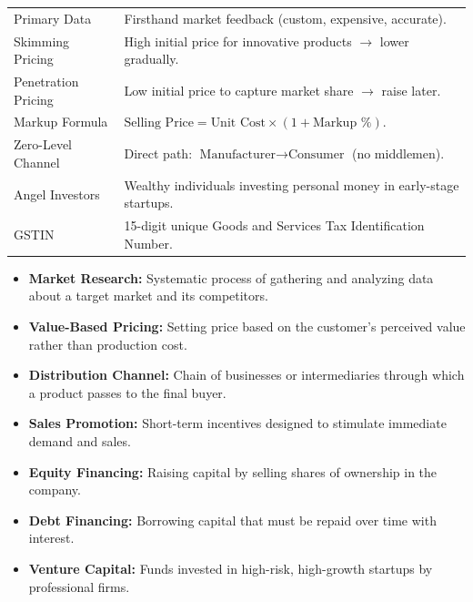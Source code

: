 \documentclass[12pt,a4paper]{article}
\renewcommand{\arraystretch}{1.45}
\begin{document}
\begin{tcolorbox}[formulabox, title={\textbf{Key Concepts at a Glance}}]
\renewcommand{\arraystretch}{1.3}
\begin{tabularx}{\linewidth}{B{4.0cm} X}
Primary Data & Firsthand market feedback (custom, expensive, accurate). \\
Skimming Pricing & High initial price for innovative products $\rightarrow$ lower gradually. \\
Penetration Pricing & Low initial price to capture market share $\rightarrow$ raise later. \\
Markup Formula & $\text{Selling Price} = \text{Unit Cost} \times (1 + \text{Markup \%})$. \\
Zero-Level Channel & Direct path: $\text{Manufacturer} \rightarrow \text{Consumer}$ (no middlemen). \\
Angel Investors & Wealthy individuals investing personal money in early-stage startups. \\
GSTIN & 15-digit unique Goods and Services Tax Identification Number. \\
\end{tabularx}
\end{tcolorbox}

\begin{tcolorbox}[defbox, title={\textbf{One-Line Definitions}}]
\begin{itemize}[leftmargin=*, itemsep=2.5pt, topsep=0pt]
  \item \textbf{Market Research:} Systematic process of gathering and analyzing data about a target market and its competitors.
  \item \textbf{Value-Based Pricing:} Setting price based on the customer's perceived value rather than production cost.
  \item \textbf{Distribution Channel:} Chain of businesses or intermediaries through which a product passes to the final buyer.
  \item \textbf{Sales Promotion:} Short-term incentives designed to stimulate immediate demand and sales.
  \item \textbf{Equity Financing:} Raising capital by selling shares of ownership in the company.
  \item \textbf{Debt Financing:} Borrowing capital that must be repaid over time with interest.
  \item \textbf{Venture Capital:} Funds invested in high-risk, high-growth startups by professional firms.
\end{itemize}
\end{tcolorbox}
\end{document}
